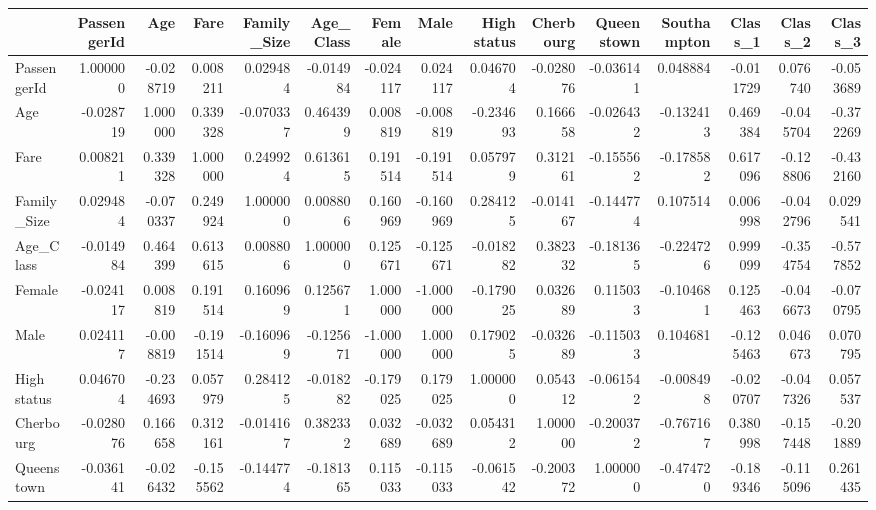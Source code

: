 \begin{tabular}{lrrrrrrrrrrrrrr}
\toprule
{} &  PassengerId &       Age &      Fare &  Family\_Size &  Age\_Class &    Female &      Male &  High status &  Cherbourg &  Queenstown &  Southampton &   Class\_1 &   Class\_2 &   Class\_3 \\
\midrule
PassengerId &     1.000000 & -0.028719 &  0.008211 &     0.029484 &  -0.014984 & -0.024117 &  0.024117 &     0.046704 &  -0.028076 &   -0.036141 &     0.048884 & -0.011729 &  0.076740 & -0.053689 \\
Age         &    -0.028719 &  1.000000 &  0.339328 &    -0.070337 &   0.464399 &  0.008819 & -0.008819 &    -0.234693 &   0.166658 &   -0.026432 &    -0.132413 &  0.469384 & -0.045704 & -0.372269 \\
Fare        &     0.008211 &  0.339328 &  1.000000 &     0.249924 &   0.613615 &  0.191514 & -0.191514 &     0.057979 &   0.312161 &   -0.155562 &    -0.178582 &  0.617096 & -0.128806 & -0.432160 \\
Family\_Size &     0.029484 & -0.070337 &  0.249924 &     1.000000 &   0.008806 &  0.160969 & -0.160969 &     0.284125 &  -0.014167 &   -0.144774 &     0.107514 &  0.006998 & -0.042796 &  0.029541 \\
Age\_Class   &    -0.014984 &  0.464399 &  0.613615 &     0.008806 &   1.000000 &  0.125671 & -0.125671 &    -0.018282 &   0.382332 &   -0.181365 &    -0.224726 &  0.999099 & -0.354754 & -0.577852 \\
Female      &    -0.024117 &  0.008819 &  0.191514 &     0.160969 &   0.125671 &  1.000000 & -1.000000 &    -0.179025 &   0.032689 &    0.115033 &    -0.104681 &  0.125463 & -0.046673 & -0.070795 \\
Male        &     0.024117 & -0.008819 & -0.191514 &    -0.160969 &  -0.125671 & -1.000000 &  1.000000 &     0.179025 &  -0.032689 &   -0.115033 &     0.104681 & -0.125463 &  0.046673 &  0.070795 \\
High status &     0.046704 & -0.234693 &  0.057979 &     0.284125 &  -0.018282 & -0.179025 &  0.179025 &     1.000000 &   0.054312 &   -0.061542 &    -0.008498 & -0.020707 & -0.047326 &  0.057537 \\
Cherbourg   &    -0.028076 &  0.166658 &  0.312161 &    -0.014167 &   0.382332 &  0.032689 & -0.032689 &     0.054312 &   1.000000 &   -0.200372 &    -0.767167 &  0.380998 & -0.157448 & -0.201889 \\
Queenstown  &    -0.036141 & -0.026432 & -0.155562 &    -0.144774 &  -0.181365 &  0.115033 & -0.115033 &    -0.061542 &  -0.200372 &    1.000000 &    -0.474720 & -0.189346 & -0.115096 &  0.261435 \\

\end{tabular}
